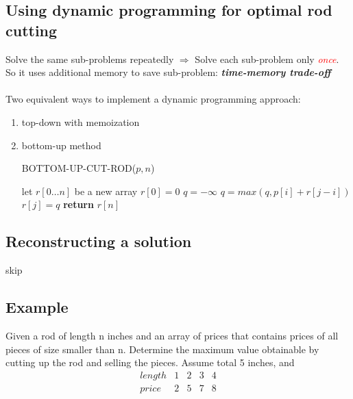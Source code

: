 \documentclass[a4paper]{article}
\begin{document}
\subsection*{Using dynamic programming for optimal rod cutting}
    Solve the same sub-problems repeatedly $\Rightarrow$ Solve each sub-problem only \textcolor{red}{\textit{once}}.\\
    So it uses additional memory to save sub-problem: \textbf{\textit{time-memory trade-off}}\\
    \\
    Two equivalent ways to implement a dynamic programming approach:
    \begin{enumerate}
        \item top-down with memoization
        \item bottom-up method
        \begin{algorithm}[H]%
        \caption{BOTTOM-UP-CUT-ROD($p,n$)}
        \begin{algorithmic}[1] %
            \State let $r[0\ldots n]$ be a new array
            \State $r[0]=0$
                \State $q=-\infty$
                \State $q=max(q,p[i]+r[j-i])$
                \EndFor
                \State $r[j]=q$
            \EndFor
            \State \textbf{return} $r[n]$
        \end{algorithmic}
    \end{algorithm}
    \end{enumerate}
    
\subsection*{Reconstructing a solution}
skip
\subsection*{Example}
Given a rod of length n inches and an array of prices that contains prices of all pieces of size smaller than n. Determine the maximum value obtainable by cutting up the rod and selling the pieces. Assume total 5 inches, and
    $$
    \begin{array}{c|cccc}
    length & 1 & 2 & 3 & 4\\
    \hline
    price & 2 & 5 & 7 & 8
    \end{array}
    $$
    
\end{document}
